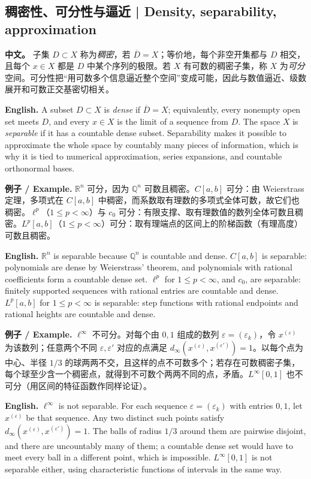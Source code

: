 \documentclass[UTF8,11pt,a4paper]{ctexart}
\newcommand{\EN}[1]{\par\noindent \textbf{English.} #1\par}
\newcommand{\EX}[2]{\par\noindent \textbf{例子 / Example.} #1\par\EN{#2}}
\newcommand{\APS}[2]{\par\noindent\textbf{中文。} #1\par\noindent\textbf{English.} #2\par\smallskip}
\begin{document}
\subsection{稠密性、可分性与逼近 | Density, separability, approximation}
\APS{子集 $D\subset X$ 称为\emph{稠密}，若 $\overline D=X$；等价地，每个非空开集都与 $D$ 相交，且每个 $x\in X$ 都是 $D$ 中某个序列的极限。若 $X$ 有可数的稠密子集，称 $X$ 为\emph{可分}空间。可分性把“用可数多个信息逼近整个空间”变成可能，因此与数值逼近、级数展开和可数正交基密切相关。}{A subset $D\subset X$ is \emph{dense} if $\overline D=X$; equivalently, every nonempty open set meets $D$, and every $x\in X$ is the limit of a sequence from $D$. The space $X$ is \emph{separable} if it has a countable dense subset. Separability makes it possible to approximate the whole space by countably many pieces of information, which is why it is tied to numerical approximation, series expansions, and countable orthonormal bases.}

\EX{$\mathbb R^n$ 可分，因为 $\mathbb Q^n$ 可数且稠密。$C[a,b]$ 可分：由 Weierstrass 定理，多项式在 $C[a,b]$ 中稠密，而系数取有理数的多项式全体可数，故它们也稠密。$\ell^p$（$1\le p<\infty$）与 $c_0$ 可分：有限支撑、取有理数值的数列全体可数且稠密。$L^p[a,b]$（$1\le p<\infty$）可分：取有理端点的区间上的阶梯函数（有理高度）可数且稠密。}{$\mathbb R^n$ is separable because $\mathbb Q^n$ is countable and dense. $C[a,b]$ is separable: polynomials are dense by Weierstrass' theorem, and polynomials with rational coefficients form a countable dense set. $\ell^p$ for $1\le p<\infty$, and $c_0$, are separable: finitely supported sequences with rational entries are countable and dense. $L^p[a,b]$ for $1\le p<\infty$ is separable: step functions with rational endpoints and rational heights are countable and dense.}

\EX{$\ell^\infty$ 不可分。对每个由 $0,1$ 组成的数列 $\varepsilon=(\varepsilon_k)$，令 $x^{(\varepsilon)}$ 为该数列；任意两个不同 $\varepsilon,\varepsilon'$ 对应的点满足 $d_\infty(x^{(\varepsilon)},x^{(\varepsilon')})=1$。以每个点为中心、半径 $1/3$ 的球两两不交，且这样的点不可数多个；若存在可数稠密子集，每个球至少含一个稠密点，就得到不可数个两两不同的点，矛盾。$L^\infty[0,1]$ 也不可分（用区间的特征函数作同样论证）。}{$\ell^\infty$ is not separable. For each sequence $\varepsilon=(\varepsilon_k)$ with entries $0,1$, let $x^{(\varepsilon)}$ be that sequence. Any two distinct such points satisfy $d_\infty(x^{(\varepsilon)},x^{(\varepsilon')})=1$. The balls of radius $1/3$ around them are pairwise disjoint, and there are uncountably many of them; a countable dense set would have to meet every ball in a different point, which is impossible. $L^\infty[0,1]$ is not separable either, using characteristic functions of intervals in the same way.}
\end{document}
